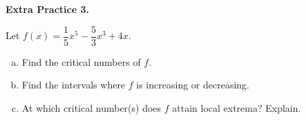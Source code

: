 \documentclass[10pt]{article}
\begin{document}
\newpage%

{\bf\color{blue} Extra Practice 3.} \reversemarginpar{}

Let $f(x)=\dfrac15x^5-\dfrac53x^3+4x$.
\begin{enumerate}[(a)]
\item Find the critical numbers of $f$.
    \vfill
\item Find the intervals where $f$ is increasing or decreasing.
    \vfill
    \vfill
\item At which critical number(s) does $f$ attain local extrema? Explain.
    \vfill
    \vfill
\end{enumerate}
\end{document}
